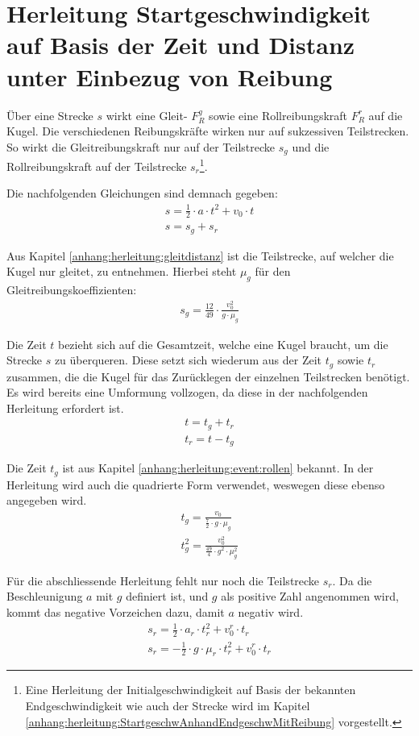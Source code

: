 \section{Herleitung Startgeschwindigkeit auf Basis der Zeit und Distanz unter Einbezug von Reibung}\label{anhang:herleitung:initialVelocityWithTime}
Über eine Strecke $s$ wirkt eine Gleit- $F^g_R$ sowie eine Rollreibungskraft $F^r_R$ auf die Kugel.
Die verschiedenen Reibungskräfte wirken nur auf sukzessiven Teilstrecken. So wirkt die Gleitreibungskraft nur auf
der Teilstrecke $s_g$ und die Rollreibungskraft auf der Teilstrecke $s_r$\footnote{Eine Herleitung der Initialgeschwindigkeit
auf Basis der bekannten Endgeschwindigkeit wie auch der Strecke wird im Kapitel \ref{anhang:herleitung:StartgeschwAnhandEndgeschwMitReibung} vorgestellt.}.

Die nachfolgenden Gleichungen sind demnach gegeben:
\begin{align}
    s = \frac{1}{2} \cdot a \cdot t^2 + v_0 \cdot t\\
    s = s_g + s_r
\end{align}

Aus Kapitel \ref{anhang:herleitung:gleitdistanz} ist die Teilstrecke, auf welcher die Kugel nur gleitet, zu entnehmen.
Hierbei steht $\mu_g$ für den Gleitreibungskoeffizienten:
\begin{align}
    s_g = \frac{12}{49} \cdot \frac{v_0^2}{g \cdot \mu_g}
\end{align}

Die Zeit $t$ bezieht sich auf die Gesamtzeit, welche eine Kugel braucht, um die Strecke $s$ zu überqueren.
Diese setzt sich wiederum aus der Zeit $t_g$ sowie $t_r$ zusammen, die die Kugel für das Zurücklegen der einzelnen
Teilstrecken benötigt. Es wird bereits eine Umformung vollzogen, da diese in der nachfolgenden Herleitung erfordert ist.
\begin{align}
    t = t_g + t_r\\
    t_r = t - t_g
\end{align}

Die Zeit $t_g$ ist aus Kapitel \ref{anhang:herleitung:event:rollen} bekannt. In der Herleitung wird auch die quadrierte
Form verwendet, weswegen diese ebenso angegeben wird.
\begin{align}
    t_g = \frac{v_0}{\frac{7}{2} \cdot g \cdot \mu_g}\\
    t_g^2 = \frac{v_0^2}{\frac{49}{4} \cdot g^2 \cdot \mu_g^2}
\end{align}

Für die abschliessende Herleitung fehlt nur noch die Teilstrecke $s_r$.
Da die Beschleunigung $a$ mit $g$ definiert ist, und $g$ als positive Zahl angenommen wird,
kommt das negative Vorzeichen dazu, damit $a$ negativ wird.
\begin{align}
    s_r = \frac{1}{2} \cdot a_r \cdot t_r^2 + v^r_0 \cdot t_r\\
    s_r = - \frac{1}{2} \cdot g \cdot \mu_r \cdot t_r^2 + v^r_0 \cdot t_r
\end{align}

